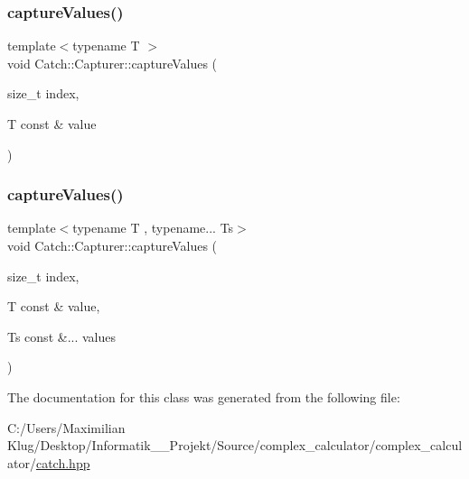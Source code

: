 \mbox{\label{class_catch_1_1_capturer_a60d08e6db2e54740bb2298bbbec3bc0b}} 
\subsubsection{\texorpdfstring{capture\+Values()}{captureValues()}\hspace{0.1cm}{\footnotesize\ttfamily [1/2]}}
{\footnotesize\ttfamily template$<$typename T $>$ \\
void Catch\+::\+Capturer\+::capture\+Values (\begin{DoxyParamCaption}\item[{size\+\_\+t}]{index,  }\item[{T const \&}]{value }\end{DoxyParamCaption})\hspace{0.3cm}{\ttfamily [inline]}}

\mbox{\label{class_catch_1_1_capturer_a76f2a097cfeb3042688300b81eb9bcbc}} 
\subsubsection{\texorpdfstring{capture\+Values()}{captureValues()}\hspace{0.1cm}{\footnotesize\ttfamily [2/2]}}
{\footnotesize\ttfamily template$<$typename T , typename... Ts$>$ \\
void Catch\+::\+Capturer\+::capture\+Values (\begin{DoxyParamCaption}\item[{size\+\_\+t}]{index,  }\item[{T const \&}]{value,  }\item[{Ts const \&...}]{values }\end{DoxyParamCaption})\hspace{0.3cm}{\ttfamily [inline]}}



The documentation for this class was generated from the following file\+:\begin{DoxyCompactItemize}
\item 
C\+:/\+Users/\+Maximilian Klug/\+Desktop/\+Informatik\+\_\+\_\+\+Projekt/\+Source/complex\+\_\+calculator/complex\+\_\+calculator/\mbox{\hyperlink{catch_8hpp}{catch.\+hpp}}\end{DoxyCompactItemize}
